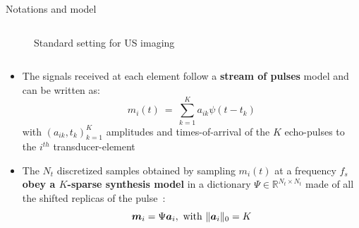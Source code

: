 {\begin{block}{Notations and model}
\begin{columns}
		\begin{column}{.43\textwidth} %
			\centering
			\begin{figure}
				{\footnotesize
				}
				\caption{Standard setting for US imaging}
			\end{figure}
		\end{column}
	\end{columns} %
	
	\begin{itemize}
		\item The signals received at each element follow a \textbf{stream of pulses} model and can be written as:
		\begin{equation*}
		m_i\left(t\right)~=~\sum_{k=1}^{K} a_{ik} \psi \left(t - t_{k}\right)
		\end{equation*}
		with $\left(a_{ik}, t_{k}\right)_{k=1}^K$ amplitudes and times-of-arrival of the $K$ echo-pulses to the $i^{th}$ transducer-element
		\item The $N_t$ discretized samples obtained by sampling $m_i\left(t\right)$ at a frequency $f_s$ \textbf{obey a $K$-sparse synthesis model} in a dictionary $\Psi \in \mathbb{R}^{N_t \times N_t}$ made of all the shifted replicas of the pulse~\cite{naini2009}:
		\begin{equation*}
			\bm{m}_i = \Psi \bm{a}_i, \textnormal{ with } \| \bm{a}_i\|_0 = K
		\end{equation*}
	\end{itemize}
	
\end{block}
\vfill 

}
